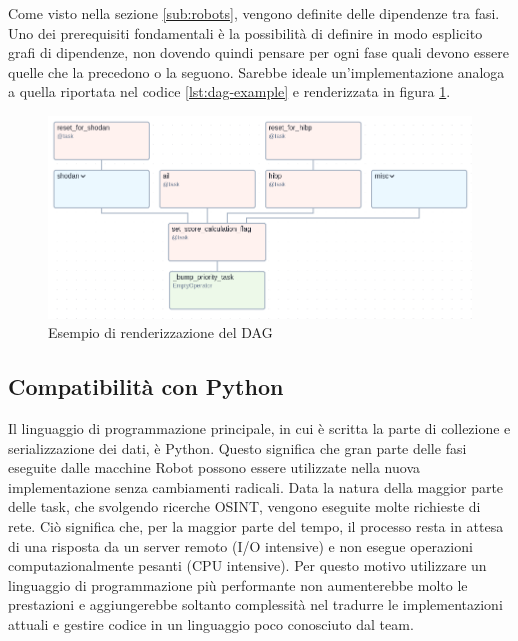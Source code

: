 Come visto nella sezione \ref{sub:robots}, vengono definite delle dipendenze tra
fasi. Uno dei prerequisiti fondamentali è la possibilità di definire in modo
esplicito grafi di dipendenze, non dovendo quindi pensare per ogni fase quali devono
essere quelle che la precedono o la seguono. Sarebbe ideale un'implementazione
analoga a quella riportata nel codice \ref{lst:dag-example} e renderizzata in
figura \ref{fig:dag-example}.

\begin{figure}[htbp]
  \centering
  \begin{minipage}{0.45\textwidth}
    \centering
    
  \end{minipage}
  \hfill
  \begin{minipage}{0.45\textwidth}
    \centering
    \includegraphics[width=\textwidth]{images/dag-example.png}
    \caption{Esempio di renderizzazione del DAG}
    \label{fig:dag-example}
  \end{minipage}
\end{figure}

\subsection{Compatibilità con Python}
\label{sub:python_compatibility}

Il linguaggio di programmazione principale, in cui è scritta la parte di collezione
e serializzazione dei dati, è Python. Questo significa che gran parte delle fasi
eseguite dalle macchine Robot possono essere utilizzate nella nuova implementazione
senza cambiamenti radicali. Data la natura della maggior parte delle task, che svolgendo
ricerche OSINT, vengono eseguite molte richieste di rete. Ciò significa che, per
la maggior parte del tempo, il processo resta in attesa di una risposta da un server
remoto (I/O intensive) e non esegue operazioni computazionalmente pesanti (CPU
intensive). Per questo motivo utilizzare un linguaggio di programmazione più
performante non aumenterebbe molto le prestazioni e aggiungerebbe soltanto
complessità nel tradurre le implementazioni attuali e gestire codice in un
linguaggio poco conosciuto dal team.


